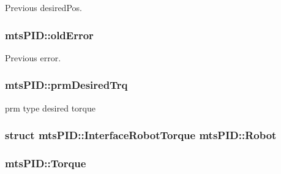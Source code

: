 Previous desired\+Pos. 

\hypertarget{classmts_p_i_d_ad9b05536756b06bd08374606fa615dc6}{}
\subsubsection[{old\+Error}]{ mts\+P\+I\+D\+::old\+Error\hspace{0.3cm}{\ttfamily [protected]}}\label{classmts_p_i_d_ad9b05536756b06bd08374606fa615dc6}


Previous error. 

\hypertarget{classmts_p_i_d_a6be58279848adac1f3612c320cf182ea}{}
\subsubsection[{prm\+Desired\+Trq}]{ mts\+P\+I\+D\+::prm\+Desired\+Trq\hspace{0.3cm}{\ttfamily [protected]}}\label{classmts_p_i_d_a6be58279848adac1f3612c320cf182ea}


prm type desired torque 

\hypertarget{classmts_p_i_d_a17e9ab759f0051e59244d3a211ba6791}{}
\subsubsection[{Robot}]{\setlength{\rightskip}{0pt plus 5cm}struct {\bf mts\+P\+I\+D\+::\+Interface\+Robot\+Torque}  mts\+P\+I\+D\+::\+Robot\hspace{0.3cm}{\ttfamily [protected]}}\label{classmts_p_i_d_a17e9ab759f0051e59244d3a211ba6791}
\hypertarget{classmts_p_i_d_a928a19f9bc0b311ec5743a108b2f8534}{}
\subsubsection[{Torque}]{ mts\+P\+I\+D\+::\+Torque\hspace{0.3cm}{\ttfamily [protected]}}\label{classmts_p_i_d_a928a19f9bc0b311ec5743a108b2f8534}


